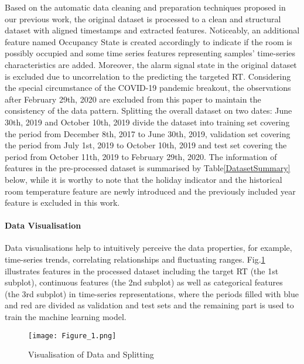 \documentclass[11pt]{article}
\begin{document}
    Based on the automatic data cleaning and preparation techniques proposed in our previous work, the original dataset is processed to a clean and structural dataset with aligned timestamps and extracted features. Noticeably, an additional feature named Occupancy State is created accordingly to indicate if the room is possibly occupied and some time series features representing samples’ time-series characteristics are added. Moreover, the alarm signal state in the original dataset is excluded due to uncorrelation to the predicting the targeted RT. Considering the special circumstance of the COVID-19 pandemic breakout, the observations after February 29th, 2020 are excluded from this paper to maintain the consistency of the data pattern. Splitting the overall dataset on two dates: June 30th, 2019 and October 10th, 2019 divide the dataset into training set covering the period from December 8th, 2017 to June 30th, 2019, validation set covering the period from July 1st, 2019 to October 10th, 2019 and test set covering the period from October 11th, 2019 to February 29th, 2020. The information of features in the pre-processed dataset is summarised by Table\ref{DatasetSummary} below, while it is worthy to note that the holiday indicator and the historical room temperature feature are newly introduced and the previously included year feature is excluded in this work.
    
    
    \paragraph{Data Visualisation}
    Data visualisations help to intuitively perceive the data properties, for example, time-series trends, correlating relationships and fluctuating ranges. Fig.\ref{DataVisualisation} illustrates features in the processed dataset including the target RT (the 1st subplot), continuous features (the 2nd subplot) as well as categorical features (the 3rd subplot) in time-series representations, where the periods filled with blue and red are divided as validation and test sets and the remaining part is used to train the machine learning model.
    
    \begin{figure}[htbp]
    	\centering
    	\texttt{[image: Figure\_1.png]}
    	\caption{Visualisation of Data and Splitting}
    	\label{DataVisualisation}
    \end{figure}
    
\end{document}
